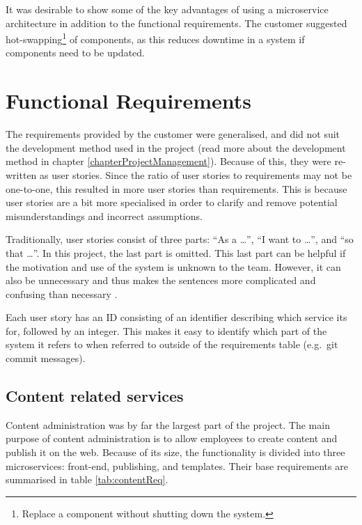 
It was desirable to show some of the key advantages of using a microservice architecture in addition to the functional requirements. The customer suggested hot-swapping\footnote{Replace a component without shutting down the system.} of components, as this reduces downtime in a system if components need to be updated.

\section{Functional Requirements} \label{sec:functionalRequirements}

The requirements provided by the customer were generalised, and did not suit the development method used in the project (read more about the development method in chapter \ref{chapterProjectManagement}). Because of this, they were re-written as user stories. Since the ratio of user stories to requirements may not be one-to-one, this resulted in more user stories than requirements. This is because user stories are a bit more specialised in order to clarify and remove potential misunderstandings and incorrect assumptions.

Traditionally, user stories consist of three parts: ``As a \dots'', ``I want to \dots'', and ``so that \dots''. In this project, the last part is omitted. This last part can be helpful if the motivation and use of the system is unknown to the team. However, it can also be unnecessary and thus makes the sentences more complicated and confusing than necessary \citep{userStories}.

Each user story has an ID consisting of an identifier describing which service its for, followed by an integer. This makes it easy to identify which part of the system it refers to when referred to outside of the requirements table (e.g.\ git commit messages). 


\subsection{Content related services}
Content administration was by far the largest part of the project. The main purpose of content administration is to allow employees to create content and publish it on the web. Because of its size, the functionality is divided into three microservices: front-end, publishing, and templates. Their base requirements are summarised in table \ref{tab:contentReq}.

